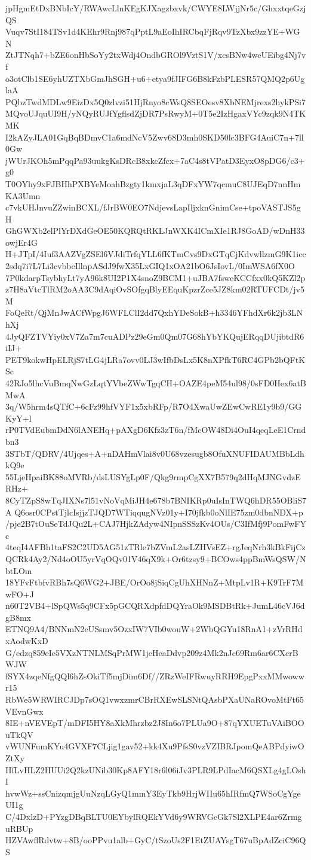 jpHgmEtDxBNbIcY/RWAwcLlnKEgKJXagzbxvk/CWYE8LWjjNr5c/GhxxtqeGzjQS
Vuqv7StI184TSv1d4KEhr9Rnj987qPptL9aEoIhIRCbqFjRqv9TzXbx9zzYE+WGN
ZtJTNqh7+bZE6onHbSoYy2txWdj4OndbGROl9VztS1V/xcsBNw4weUEibg4Nj7vf
o3otClb1SE6yhUZTXbGmJhSGH+u6+etya9fJIFG6B8kFzbPLESR57QMQ2p6UglaA
PQbzTwdMDLw9EizDx5Q0zlvzi51HjRnyo8cWsQ8SEOesv8XbNEMjrexs2hykPSi7
MQvoUJquUI9H/yNQyRUJfYgflsdZjDR7PsRwyM+0T5e2IzHgaxVYc9zqk9N4TKMK
I2kAZyJLA01GqBqBDmvC1a6mdNcV5Zwv68D3mh0SKD50lc3BFG4AuiC7n+7ll0Gw
jWUrJKOh5mPqqPa93uukgKsDRcB8xkcZfcx+7aC4s8tVPatD3EyxO8pDG6/c3+g0
T0OYhy9xFJBHhPXBYeMoahBzgty1kmxjaL3qDFxYW7qcmuC8UJEqD7nnHmKA3Umn
c7vkUHJnvuZZwinBCXL/fJrBW0EO7NdjevsLapIljxknGnimCse+tpoVASTJS5gH
GhGWXb2elPlYrDXdGeOE50KQRQtRKLJnWXK4ICmXIe1RJ8GoAD/wDnH33owjEr4G
H+JTpI/4Iuf3AAZVgZSEl6VJdiTrfqYLL6fKTmCvs9DxGTqCjKdvwllzmG9K1icc
2sdq7i7L7Li3cvbbcIllnpASdJ9fwX35LxGIQ1xOA21bO6JsIovL/0ImWSA6fX0O
7P0kdarpTsybhyLt7yA96k8UI2P1X4snoZ9BCM1+uJBA7fsweKCCfxx0kQ5KZl2p
z7H8aVtcTlRM2oAA3C9dAqiOvSOfgqBlyEEquKpzrZce5JZ8km02RTUFCDt/jv5M
FoQeRt/QjMnJwACfWpgJ6WFLClI2dd7QxhYDeSokB+h3346YFhdXr6k2jb3LNhXj
4JyQFZTVYiy0xV7Za7m7cuADPz29eGm0Qm07G68hYbYKQujERqqDUjibtdR6iIJ+
PET9kokwHpELRjS7tLG4jLRa7ovv0LJ3wIfbDsLx5K8nXPfkT6RC4GPb2bQFtKSc
42RJo5lhcVuBmqNwGzLqtYVbeZWwTgqCH+OAZE4peM54ul98/0sFD0Hex6atBMwA
3q/W5hrm4sQTfC+6cFz99hfVYF1x5xbRFp/R7O4XwaUwZEwCwRE1y9b9/GGKyY+l
rP0TVdEubmDdN6lANEHq+pAXgD6Kfz3zT6n/fMcOW48Di4OuI4qeqLeE1Crndbn3
3STbT/QDRV/4Ujqes+A+nDAHmVlai8v0U68vzesugb8OfuXNUFIDAUMBbLdhkQ9e
55LjeHpaiBK88oMVRb/dsLUSYgLp0F/Qkg9rmpCgXX7B579q2dHqMJNGvdzERHz+
8CyTZpS8wTqJIXNs7l51vNoVqMiJH4e678b7BNIKRp0uIsInTWQ6hDR55OBliS7A
Q6osr0CPstTjlcIsjjzTJQD7WTiqqugNVz01y+I70jfkb0oNlIE75zm0dbnNDX+p
/pje2B7tOuSeTdJQu2L+CAJ7HjkZAdyw4NIpnSSSzKv4OUs/C3IfMfj9PomFwFYc
4teqI4AFBh1taFS2C2UD5AG51zTRle7bZVmL2asLZHVsEZ+rgJeqNrh3kBkFijCz
QCRk4Ay2/Nd4oOU5yrVqOQv01V46qX9k+Or6tzsy9+BCOws4ppBmWsQSW/NbtLOm
18YFvFtbfvRBh7sQ6WG2+JBE/OrOo8jSiqCgUhXHNnZ+MtpLv1R+K9TrF7MwFO+J
n60T2VB4+lSpQWs5q9CFx5pGCQRXdpfdDQYraOk9MSDBtRk+JumL46cVJ6dgB8mx
ETNQ9A4/BNNmN2eUSsmv5OzxIW7VIb0wouW+2WbQGYu18RnA1+zVrRHdxAodwKxD
G/edzq859eIe5VXzNTNLMSqPrMW1jeHeaDdvp209z4Mk2nJc69Rm6ar6CXcrBWJW
fSYX4zqeNfgQQl6hZsOkiTf5mjDim6Df//ZRzWeIFRwuyRRH9EpgPxxMMwowwr15
RbWe5WRWIRCJDp7sOQ1vwxzmrCBrRXEwSLSNtQAsbPXaUNaROvoMtFt65VEvnGwx
8IE+nVEVEpT/mDFI5HY8aXkMhrzbz2J8In6o7PLUa9O+87qYXUETuVAiBOOuTkQV
vWUNFumKYu4GVXF7CLjig1gav52+kk4Xu9PfsS0vzVZIBRJpomQeABPdyiwOZtXy
HfLvHLZ2HUUi2Q2kzUNib30Kp8AFY18r6l06iJv3PLR9LPdIacM6QSXLg4gLOshI
hvwWz+ssCnizqmjgUuNzqLGyQ1mmY3EyTkb9HrjWIIu65hIRfmQ7WSoCgYgeUI1g
C/4DxlzD+PYzgDBqBLTU0EYbylRQEkYVd6y9WRVGcGk7Sl2XLPE4ar6ZrmguRBUp
HZVAwflRdvtw+8B/ooPPvu1alb+GyC/tSzoUs2F1EtZUAYsgT67uBpAdZciC96QS
